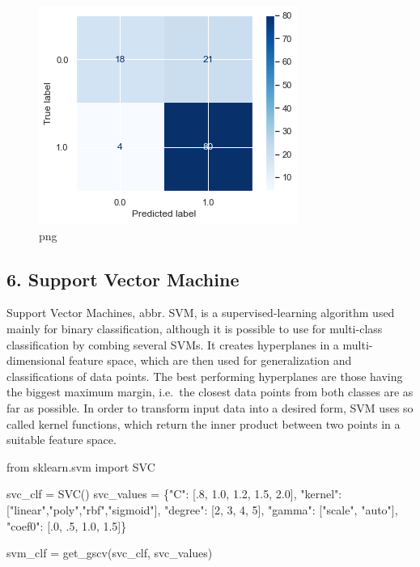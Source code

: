 \documentclass[]{article}
\newenvironment{Shaded}{}{}
\newcommand{\DecValTok}[1]{\textcolor[rgb]{0.25,0.63,0.44}{#1}}
\newcommand{\FloatTok}[1]{\textcolor[rgb]{0.25,0.63,0.44}{#1}}
\newcommand{\ImportTok}[1]{#1}
\newcommand{\NormalTok}[1]{#1}
\newcommand{\OperatorTok}[1]{\textcolor[rgb]{0.40,0.40,0.40}{#1}}
\newcommand{\StringTok}[1]{\textcolor[rgb]{0.25,0.44,0.63}{#1}}
\begin{document}
\begin{figure}
\centering
\includegraphics{notebook_files/notebook_48_3.png}
\caption{png}
\end{figure}

\hypertarget{support-vector-machine}{%
\subsection{6. Support Vector Machine}\label{support-vector-machine}}

Support Vector Machines, abbr. SVM, is a supervised-learning algorithm
used mainly for binary classification, although it is possible to use
for multi-class classification by combing several SVMs. It creates
hyperplanes in a multi-dimensional feature space, which are then used
for generalization and classifications of data points. The best
performing hyperplanes are those having the biggest maximum margin,
i.e.~the closest data points from both classes are as far as possible.
In order to transform input data into a desired form, SVM uses so called
kernel functions, which return the inner product between two points in a
suitable feature space.

\begin{Shaded}
\begin{Highlighting}[]
\ImportTok{from}\NormalTok{ sklearn.svm }\ImportTok{import}\NormalTok{ SVC}

\NormalTok{svc_clf }\OperatorTok{=}\NormalTok{ SVC()}
\NormalTok{svc_values }\OperatorTok{=}\NormalTok{ \{}\StringTok{"C"}\NormalTok{: [.}\DecValTok{8}\NormalTok{, }\FloatTok{1.0}\NormalTok{, }\FloatTok{1.2}\NormalTok{, }\FloatTok{1.5}\NormalTok{, }\FloatTok{2.0}\NormalTok{],}
              \StringTok{"kernel"}\NormalTok{: [}\StringTok{"linear"}\NormalTok{,}\StringTok{"poly"}\NormalTok{,}\StringTok{"rbf"}\NormalTok{,}\StringTok{"sigmoid"}\NormalTok{],}
              \StringTok{"degree"}\NormalTok{: [}\DecValTok{2}\NormalTok{, }\DecValTok{3}\NormalTok{, }\DecValTok{4}\NormalTok{, }\DecValTok{5}\NormalTok{], }
              \StringTok{"gamma"}\NormalTok{: [}\StringTok{"scale"}\NormalTok{, }\StringTok{"auto"}\NormalTok{], }
              \StringTok{"coef0"}\NormalTok{: [.}\DecValTok{0}\NormalTok{, }\FloatTok{.5}\NormalTok{, }\FloatTok{1.0}\NormalTok{, }\FloatTok{1.5}\NormalTok{]\}}
              
\NormalTok{svm_clf }\OperatorTok{=}\NormalTok{ get_gscv(svc_clf, svc_values)}
\end{Highlighting}
\end{Shaded}
\end{document}
